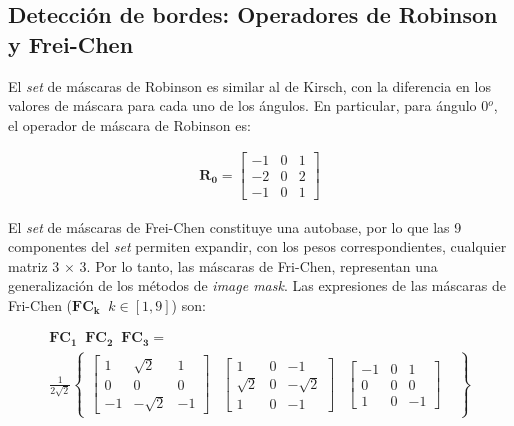 \normalsize 


\subsection{Detecci\'on de bordes: Operadores de Robinson y Frei-Chen}
\label{CapV_6}

El \textit{set} de m\'ascaras de Robinson es similar al de Kirsch, con la diferencia en los valores de m\'ascara para cada uno 
de los \'angulos.
%
En particular, para \'angulo 0$^{o}$, el operador de m\'ascara de Robinson es:

\begin{eqnarray}
	\mathbf{R_{0}} = \left[ \begin{array}{ccc}  -1 & 0 & 1  \\  -2 & 0 & 2 \\ -1 & 0 & 1 \end{array} \right]
\label{EqAAA}
\end{eqnarray}

El \textit{set} de m\'ascaras de Frei-Chen constituye una autobase, por lo que las 9 componentes del \textit{set} permiten expandir, con 
los pesos correspondientes, cualquier matriz 3 $\times$ 3.
%
Por lo tanto, las m\'ascaras de Fri-Chen, representan una generalizaci\'on de los m\'etodos de \textit{image mask}.
%
Las expresiones de las m\'ascaras de Fri-Chen ($\mathbf{FC_{k}} \; \; k \in [1, 9] $) son:


\begin{eqnarray}
	\mathbf{ FC_{1} \; \; FC_{2} \; \; FC_{3} }  =  \nonumber \\ 
	\frac{1}{2 \sqrt{2}} \left\{ 
	\begin{array}{cccc} 
	\left[  \begin{array}{ccc}  1 & \sqrt{2} & 1  \\  0 & 0 & 0 \\ -1 & -\sqrt{2} & -1 \end{array} \right] &
	\left[ \begin{array}{ccc}  1 & 0 & -1  \\  \sqrt{2} & 0 & -\sqrt{2} \\ 1 & 0 & -1 \end{array} \right] &
	\left[ \begin{array}{ccc}  -1 & 0 & 1  \\  0 & 0 & 0 \\ 1 & 0 & -1 \end{array} \right] &
	\end{array} \right\} \nonumber
\label{EqAAB}
\end{eqnarray}

